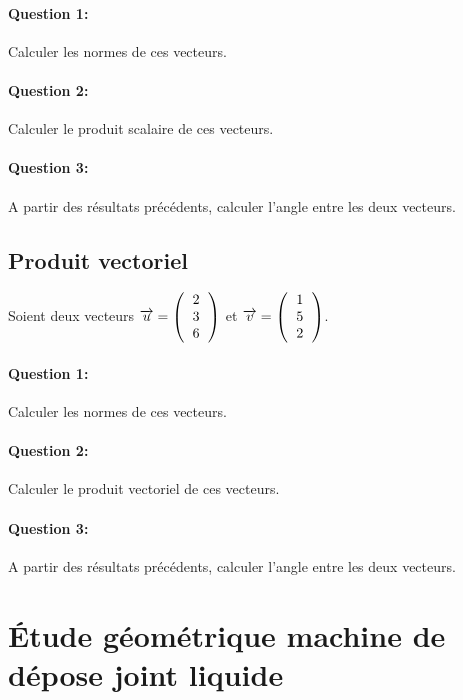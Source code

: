 \paragraph{Question 1:} Calculer les normes de ces vecteurs.

\paragraph{Question 2:} Calculer le produit scalaire de ces vecteurs.

\paragraph{Question 3:} A partir des résultats précédents, calculer l'angle entre les deux vecteurs.

\subsection{Produit vectoriel}

Soient deux vecteurs $\overrightarrow{u}=\left(\begin{tabular}{c} 2 \\ 3 \\ 6 \end{tabular}\right)$ et $\overrightarrow{v}=\left(\begin{tabular}{c} 1 \\ 5 \\ 2 \end{tabular}\right)$.

\paragraph{Question 1:} Calculer les normes de ces vecteurs.

\paragraph{Question 2:} Calculer le produit vectoriel de ces vecteurs.

\paragraph{Question 3:} A partir des résultats précédents, calculer l'angle entre les deux vecteurs.

\newpage

\section{Étude géométrique machine de dépose joint liquide}

